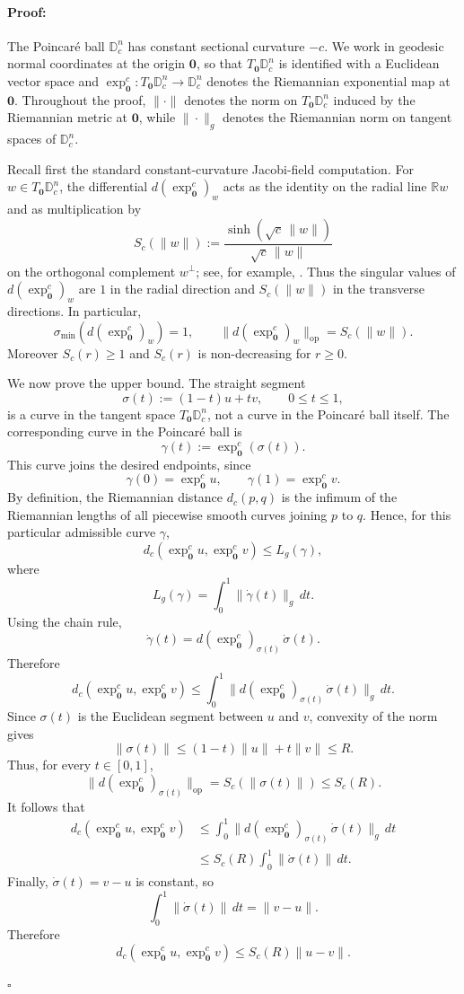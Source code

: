 \documentclass[letterpaper]{article}
\newenvironment{proof}[1][Proof]{\paragraph{#1:}}{\hfill$\square$}
\newcommand{\D}{\mathbb{D}}      %
\newcommand{\exps}{\exp_{\mathbf{0}}^c}
\begin{document}
\begin{proof}
The Poincar\'e ball $\D_c^n$ has constant sectional curvature $-c$. We work in
geodesic normal coordinates at the origin $\mathbf 0$, so that
$T_{\mathbf 0}\D_c^n$ is identified with a Euclidean vector space and
$\exps:T_{\mathbf 0}\D_c^n\to \D_c^n$ denotes the Riemannian exponential map
at $\mathbf 0$. Throughout the proof, $\|\cdot\|$ denotes the norm on
$T_{\mathbf 0}\D_c^n$ induced by the Riemannian metric at $\mathbf 0$, while
$\|\cdot\|_g$ denotes the Riemannian norm on tangent spaces of $\D_c^n$.

Recall first the standard constant-curvature Jacobi-field computation. For
$w\in T_{\mathbf 0}\D_c^n$, the differential $d(\exps)_w$ acts as the identity
on the radial line $\mathbb R w$ and as multiplication by
\[
S_c(\|w\|):=\frac{\sinh(\sqrt c\,\|w\|)}{\sqrt c\,\|w\|}
\]
on the orthogonal complement $w^\perp$; see, for example,
\cite{boumal2023introduction}. Thus the singular values of $d(\exps)_w$ are
$1$ in the radial direction and $S_c(\|w\|)$ in the transverse directions.
In particular,
\[
\sigma_{\min}(d(\exps)_w)=1,
\qquad
\|d(\exps)_w\|_{\mathrm{op}}=S_c(\|w\|).
\]
Moreover $S_c(r)\ge 1$ and $S_c(r)$ is non-decreasing for $r\ge 0$.

We now prove the upper bound. The straight segment
\[
\sigma(t):=(1-t)u+tv,\qquad 0\le t\le 1,
\]
is a curve in the tangent space $T_{\mathbf 0}\D_c^n$, not a curve in the
Poincar\'e ball itself. The corresponding curve in the Poincar\'e ball is
\[
\gamma(t):=\exps(\sigma(t)).
\]
This curve joins the desired endpoints, since
\[
\gamma(0)=\exps u,
\qquad
\gamma(1)=\exps v.
\]
By definition, the Riemannian distance $d_c(p,q)$ is the infimum of the
Riemannian lengths of all piecewise smooth curves joining $p$ to $q$. Hence,
for this particular admissible curve $\gamma$,
\[
d_c(\exps u,\exps v)\le L_g(\gamma),
\]
where
\[
L_g(\gamma)=\int_0^1 \|\dot\gamma(t)\|_g\,dt.
\]
Using the chain rule,
\[
\dot\gamma(t)=d(\exps)_{\sigma(t)}\,\dot\sigma(t).
\]
Therefore
\[
d_c(\exps u,\exps v)
\le
\int_0^1
\big\|d(\exps)_{\sigma(t)}\,\dot\sigma(t)\big\|_g\,dt.
\]
Since $\sigma(t)$ is the Euclidean segment between $u$ and $v$, convexity of
the norm gives
\[
\|\sigma(t)\|
\le
(1-t)\|u\|+t\|v\|
\le
R.
\]
Thus, for every $t\in[0,1]$,
\[
\|d(\exps)_{\sigma(t)}\|_{\mathrm{op}}
=
S_c(\|\sigma(t)\|)
\le
S_c(R).
\]
It follows that
\[
\begin{aligned}
d_c(\exps u,\exps v)
&\le
\int_0^1
\big\|d(\exps)_{\sigma(t)}\,\dot\sigma(t)\big\|_g\,dt \\
&\le
S_c(R)\int_0^1 \|\dot\sigma(t)\|\,dt.
\end{aligned}
\]
Finally, $\dot\sigma(t)=v-u$ is constant, so
\[
\int_0^1\|\dot\sigma(t)\|\,dt
=
\|v-u\|.
\]
Therefore
\[
d_c(\exps u,\exps v)
\le
S_c(R)\|u-v\|.
\]


\end{proof}
\end{document}
